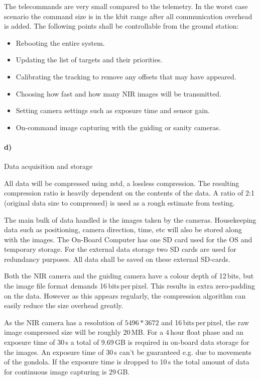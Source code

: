 \newpage
The telecommands are very small compared to the telemetry. In the worst case scenario the command size is in the kbit range after all communication overhead is added. The following points shall be controllable from the ground station:

\begin{itemize}
	\item Rebooting the entire system.
	\item Updating the list of targets and their priorities.
	\item Calibrating the tracking to remove any offsets that may have appeared.
	\item Choosing how fast and how many NIR images will be transmitted.
	\item Setting camera settings such as exposure time and sensor gain.
	\item On-command image capturing with the guiding or sanity cameras.
\end{itemize}

\paragraph{d)} Data acquisition and storage

All data will be compressed using zstd, a lossless compression. The resulting compression ratio is heavily dependent on the contents of the data. A ratio of 2:1 (original data size to compressed) is used as a rough estimate from testing.

The main bulk of data handled is the images taken by the cameras. Housekeeping data such as positioning, camera direction, time, etc will also be stored along with the images. The On-Board Computer has one SD card used for the OS and temporary storage. For the external data storage two SD cards are used for redundancy purposes. All data shall be saved on these external SD-cards.

Both the NIR camera and the guiding camera have a colour depth of 12\,bits, but the image file format demands 16\,bits\,per\,pixel. This results in extra zero-padding on the data. However as this appears regularly, the compression algorithm can easily reduce the size overhead greatly.

As the NIR camera has a resolution of $5496 * 3672$ and 16\,bits\,per\,pixel, the raw image compressed size will be roughly 20\,MB. For a 4\,hour float phase and an exposure time of 30\,s a total of  9.69\,GB is required in on-board data storage for the images. An exposure time of 30\,s can't be guaranteed e.g. due to movements of the gondola. If the exposure time is dropped to 10\,s the total amount of data for continuous image capturing is 29\,GB.

